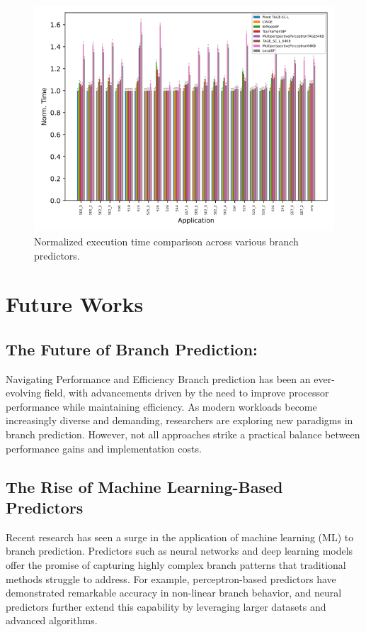 \documentclass[10pt,journal,compsoc]{IEEEtran}
\begin{document}
\begin{figure}
    \centering
    \includegraphics[width=0.8\linewidth]{time.png}
    \caption{Normalized execution time comparison across various branch predictors.}\label{time}
\end{figure}

\section{Future Works}\label{conclusion}

\subsection*{The Future of Branch Prediction: }Navigating Performance and Efficiency
Branch prediction has been an ever-evolving field, with advancements driven by the need to improve processor performance while maintaining efficiency. As modern workloads become increasingly diverse and demanding, researchers are exploring new paradigms in branch prediction. However, not all approaches strike a practical balance between performance gains and implementation costs.

\subsection*{The Rise of Machine Learning-Based Predictors}
Recent research has seen a surge in the application of machine learning (ML) to branch prediction. Predictors such as neural networks and deep learning models offer the promise of capturing highly complex branch patterns that traditional methods struggle to address. For example, perceptron-based predictors have demonstrated remarkable accuracy in non-linear branch behavior, and neural predictors further extend this capability by leveraging larger datasets and advanced algorithms.
\end{document}
